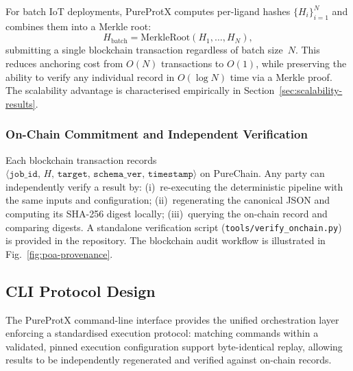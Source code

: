\documentclass[conference]{IEEEtran}
\newcommand{\rev}[2]{#2}
\begin{document}
For batch IoT deployments, PureProtX computes per-ligand
hashes $\{H_i\}_{i=1}^N$ and combines them into a Merkle
root:
\begin{equation}
H_{\mathrm{batch}} = \mathrm{MerkleRoot}(H_1, \ldots, H_N),
\end{equation}
submitting a single blockchain transaction regardless of
batch size~$N$.
This reduces anchoring cost from $O(N)$ transactions to
$O(1)$, while preserving the ability to verify any
individual record in $O(\log N)$ time via a Merkle proof.
The scalability advantage is characterised empirically
in Section~\ref{sec:scalability-results}.

\subsubsection{On-Chain Commitment and Independent Verification}

Each blockchain transaction records
$\langle\texttt{job\_id},\, H,\, \texttt{target},\,
\texttt{schema\_ver},\, \texttt{timestamp}\rangle$
on PureChain.
Any party can independently verify a result by:
(i)~re-executing the deterministic pipeline with the
same inputs and configuration; (ii)~regenerating the
canonical JSON and computing its SHA-256 digest locally;
(iii)~querying the on-chain record and comparing digests.
A standalone verification script (\texttt{tools/verify\_onchain.py})
is provided in the repository.
The blockchain audit workflow is illustrated in
Fig.~\ref{fig:poa-provenance}.

\subsection{\textbf{CLI Protocol Design}}
\label{clidesign}

The PureProtX command-line interface provides the unified
orchestration layer enforcing a standardised execution
protocol: \rev{R1.1}{matching commands within a validated, pinned execution configuration support byte-identical replay}, allowing results to be
independently regenerated and verified against on-chain
records.
\end{document}
